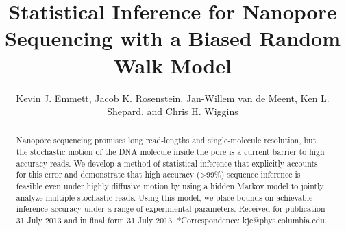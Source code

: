 \documentclass{biophys_letter}
\title{Statistical Inference for Nanopore Sequencing with a Biased Random Walk Model}
\author{Kevin J. Emmett,{\authdag *} Jacob K. Rosenstein,{\authpar} Jan-Willem van de Meent,{\authddag} Ken L. Shepard,{\addrS} and Chris H. Wiggins{\authddag}}
\begin{document}
\setcounter{page}{1}

\pagestyle{headings}

\maketitle

\begin{abstract}
{Nanopore sequencing promises long read-lengths and single-molecule resolution, but the stochastic motion of the DNA molecule inside the pore is a current barrier to high accuracy reads.
We develop a method of statistical inference that explicitly accounts for this error and demonstrate that high accuracy (\textgreater 99\%) sequence inference is feasible even under highly diffusive motion by using a hidden Markov model to jointly analyze multiple stochastic reads.
Using this model, we place bounds on achievable inference accuracy under a range of experimental parameters.}
{Received for publication 31 July 2013 and in final form 31 July 2013.}
{*Correspondence: kje@phys.columbia.edu.}
\end{abstract}
\end{document}
